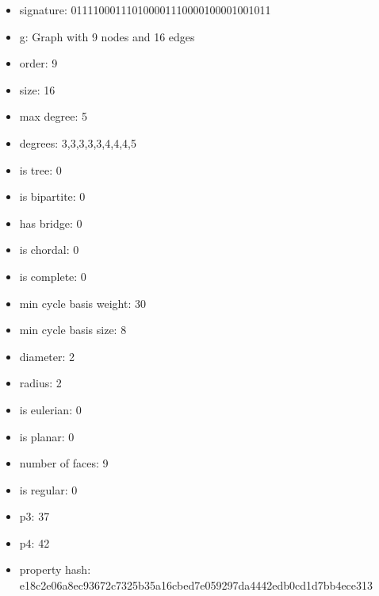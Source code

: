 \newpage
\begin{figure}
\end{figure}
\begin{itemize}
\item signature: 011110001110100001110000100001001011
\item g: Graph with 9 nodes and 16 edges
\item order: 9
\item size: 16
\item max degree: 5
\item degrees: 3,3,3,3,3,4,4,4,5
\item is tree: 0
\item is bipartite: 0
\item has bridge: 0
\item is chordal: 0
\item is complete: 0
\item min cycle basis weight: 30
\item min cycle basis size: 8
\item diameter: 2
\item radius: 2
\item is eulerian: 0
\item is planar: 0
\item number of faces: 9
\item is regular: 0
\item p3: 37
\item p4: 42
\item property hash: e18c2e06a8ec93672c7325b35a16cbed7e059297da4442edb0cd1d7bb4ece313
\end{itemize}
